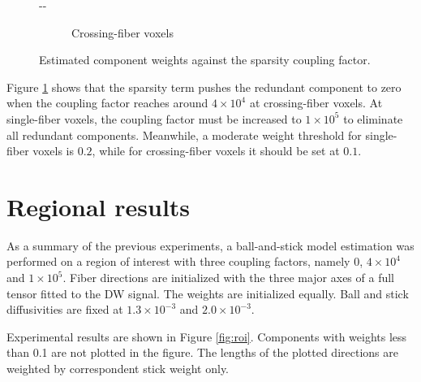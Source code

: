 \documentclass{article}
\begin{document}
\begin{figure}[H]
\begin{adjustwidth}{-\oddsidemargin}{-\rightmargin}
\begin{subfigure}{0.8\paperwidth}
      \caption{Crossing-fiber voxels}
    \end{subfigure}
  \end{adjustwidth}
  \caption{Estimated component weights against the sparsity coupling factor.}
  \label{fig:sparsity_plot}
\end{figure}

Figure \ref{fig:sparsity_plot} shows that the sparsity term pushes the redundant component to zero when the coupling factor reaches around $4\times 10^4$ at crossing-fiber voxels. At single-fiber voxels, the coupling factor must be increased to $1\times 10^5$ to eliminate all redundant components. Meanwhile, a moderate weight threshold for single-fiber voxels is $0.2$, while for crossing-fiber voxels it should be set at $0.1$.

\section{Regional results}

As a summary of the previous experiments, a ball-and-stick model estimation was performed on a region of interest with three coupling factors, namely 0, $4\times 10^4$ and $1\times 10^5$. Fiber directions are initialized with the three major axes of a full tensor fitted to the DW signal. The weights are initialized equally. Ball and stick diffusivities are fixed at $1.3\times 10^{-3}$ and $2.0\times 10^{-3}$.

Experimental results are shown in Figure \ref{fig:roi}. Components with weights less than 0.1 are not plotted in the figure. The lengths of the plotted directions are weighted by correspondent stick weight only.
\end{document}
